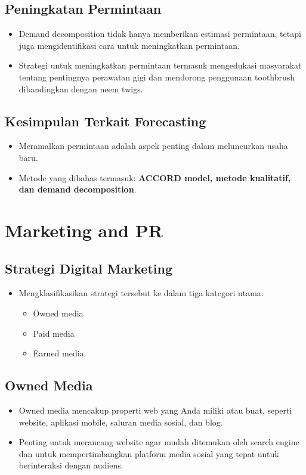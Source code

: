 \documentclass{article}
\begin{document}
\subsection{Peningkatan Permintaan}
\begin{itemize}
    \item Demand decomposition tidak hanya memberikan estimasi permintaan, tetapi juga mengidentifikasi cara untuk meningkatkan permintaan.
    \item Strategi untuk meningkatkan permintaan termasuk mengedukasi masyarakat tentang pentingnya perawatan gigi dan mendorong penggunaan toothbrush dibandingkan dengan neem twigs.
\end{itemize}

\subsection{Kesimpulan Terkait Forecasting}
\begin{itemize}
    \item Meramalkan permintaan adalah aspek penting dalam meluncurkan usaha baru.
    \item Metode yang dibahas termasuk: \textbf{ACCORD model, metode kualitatif, dan demand decomposition}.
\end{itemize}
\newpage
\section{Marketing and PR}
\subsection{Strategi Digital Marketing}
\begin{itemize}
    \item Mengklasifikasikan strategi tersebut ke dalam tiga kategori utama:
          \begin{itemize}
              \item Owned media
              \item Paid media
              \item Earned media.
          \end{itemize}
\end{itemize}

\subsection{Owned Media}
\begin{itemize}
    \item Owned media mencakup properti web yang Anda miliki atau buat, seperti website, aplikasi mobile, saluran media sosial, dan blog.
    \item Penting untuk merancang website agar mudah ditemukan oleh search engine dan untuk mempertimbangkan platform media sosial yang tepat untuk berinteraksi dengan audiens.
\end{itemize}
\end{document}
